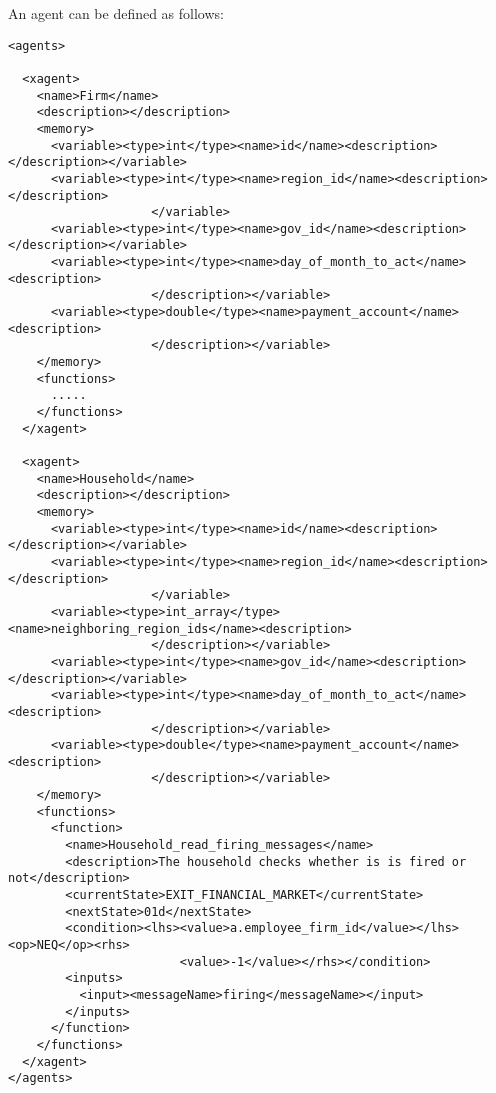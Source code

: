 An agent can be defined as follows:
\begin{mylisting}
\begin{verbatim}
<agents>

  <xagent>
    <name>Firm</name>
    <description></description>
    <memory>
      <variable><type>int</type><name>id</name><description></description></variable>
      <variable><type>int</type><name>region_id</name><description></description>
                    </variable>
      <variable><type>int</type><name>gov_id</name><description></description></variable>
      <variable><type>int</type><name>day_of_month_to_act</name><description>
                    </description></variable>
      <variable><type>double</type><name>payment_account</name><description>
                    </description></variable>
    </memory>
    <functions>
      .....
    </functions>
  </xagent>

  <xagent>
    <name>Household</name>
    <description></description>
    <memory>
      <variable><type>int</type><name>id</name><description></description></variable>
      <variable><type>int</type><name>region_id</name><description></description>
                    </variable>
      <variable><type>int_array</type><name>neighboring_region_ids</name><description>
                    </description></variable>
      <variable><type>int</type><name>gov_id</name><description></description></variable>
      <variable><type>int</type><name>day_of_month_to_act</name><description>
                    </description></variable>
      <variable><type>double</type><name>payment_account</name><description>
                    </description></variable>
    </memory>
    <functions>
      <function>
        <name>Household_read_firing_messages</name>
        <description>The household checks whether is is fired or not</description>
        <currentState>EXIT_FINANCIAL_MARKET</currentState>
        <nextState>01d</nextState>
        <condition><lhs><value>a.employee_firm_id</value></lhs><op>NEQ</op><rhs>
                        <value>-1</value></rhs></condition>
        <inputs>
          <input><messageName>firing</messageName></input>
        </inputs>
      </function>
    </functions>
  </xagent>
</agents>
\end{verbatim}
\end{mylisting}

